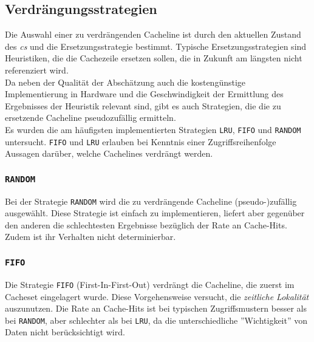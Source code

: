 \documentclass[]{scrbook}
\newtheorem{defi}{Definition}
\begin{document}
\medskip
\noindent{}
\medskip

\subsection{Verdrängungsstrategien}

Die Auswahl einer zu verdrängenden Cacheline ist durch den aktuellen Zustand des \textsl{\gls{c}s} und die Ersetzungsstrategie bestimmt.
Typische Ersetzungsstrategien sind Heuristiken, die die Cachezeile ersetzen sollen, die in Zukunft am längsten nicht referenziert wird.
\\
Da neben der Qualität der Abschätzung auch die kostengünstige Implementierung in Hardware und die Geschwindigkeit der Ermittlung des Ergebnisses der Heuristik relevant sind, gibt es auch Strategien, die die zu ersetzende Cacheline pseudozufällig ermitteln.
\\
Es wurden die am häufigsten implementierten Strategien \texttt{LRU}, \texttt{FIFO} und \texttt{RANDOM} untersucht.
\texttt{FIFO} und \texttt{LRU} erlauben bei Kenntnis einer Zugriffsreihenfolge Aussagen darüber, welche Cachelines verdrängt werden.

\subsubsection{\texttt{RANDOM}}

Bei der Strategie \texttt{RANDOM} wird die zu verdrängende Cacheline (pseudo-)zufällig ausgewählt.
Diese Strategie ist einfach zu implementieren, liefert aber gegenüber den anderen die schlechtesten Ergebnisse bezüglich der Rate an Cache-Hits. Zudem ist ihr Verhalten nicht determinierbar.

\subsubsection{\texttt{FIFO}}

Die Strategie \texttt{FIFO} (First-In-First-Out) verdrängt die Cacheline, die zuerst im Cacheset eingelagert wurde.
Diese Vorgehensweise versucht, die \textsl{zeitliche Lokalität} auszunutzen.
Die Rate an Cache-Hits ist bei typischen Zugriffsmustern besser als bei \texttt{RANDOM}, aber schlechter als bei \texttt{LRU}, da die unterschiedliche ''Wichtigkeit'' von Daten nicht berücksichtigt wird.
\end{document}
